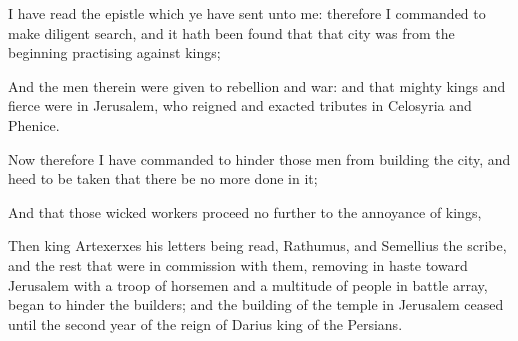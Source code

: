 {\par }{\PP {}I have read the epistle which ye have sent unto me: therefore I commanded to make diligent search, and it hath been found that that city was from the beginning practising against kings;
\par }{\PP {}And the men therein were given to rebellion and war: and that mighty kings and fierce were in Jerusalem, who reigned and exacted tributes in Celosyria and Phenice.
\par }{\PP {}Now therefore I have commanded to hinder those men from building the city, and heed to be taken that there be no more done in it;
\par }{\PP {}And that those wicked workers proceed no further to the annoyance of kings,
\par }{\PP {}Then king Artexerxes his letters being read, Rathumus, and Semellius the scribe, and the rest that were in commission with them, removing in haste toward Jerusalem with a troop of horsemen and a multitude of people in battle array, began to hinder the builders; and the building of the temple in Jerusalem ceased until the second year of the reign of Darius king of the Persians.

}
